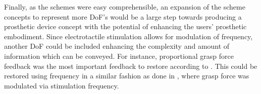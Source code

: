 Finally, as the schemes were easy comprehensible, an expansion of the scheme concepts to represent more DoF's would be a large step towards producing a prosthetic device concept with the potential of enhancing the users' prosthetic embodiment. Since electrotactile stimulation allows for modulation of frequency, another DoF could be included enhancing the complexity and amount of information which can be conveyed. For instance, proportional grasp force feedback was the most important feedback to restore according to \cite{Peerdeman2011}. This could be restored using frequency in a similar fashion as done in \cite{Dosen2016}, where grasp force was modulated via stimulation frequency. 
 



